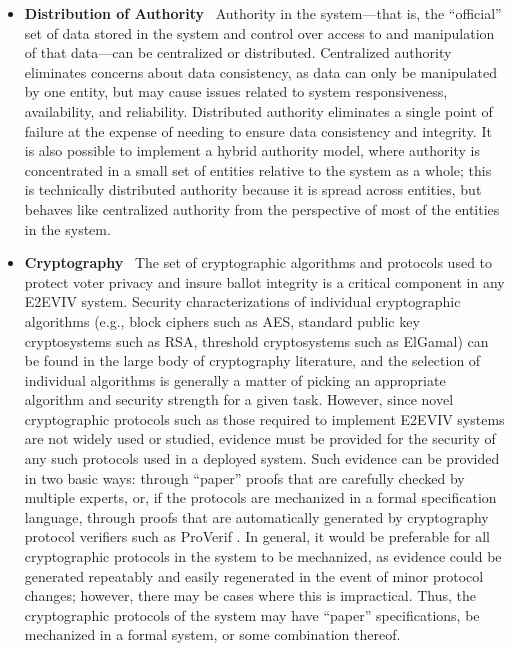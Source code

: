 \begin{itemize}
\item \textbf{Distribution of Authority} \ Authority in the
  system---that is, the ``official'' set of data stored in the system
  and control over access to and manipulation of that data---can be
  centralized or distributed. Centralized authority eliminates
  concerns about data consistency, as data can only be manipulated by
  one entity, but may cause issues related to system responsiveness,
  availability, and reliability. Distributed authority eliminates a
  single point of failure at the expense of needing to ensure data
  consistency and integrity. It is also possible to implement a hybrid
  authority model, where authority is concentrated in a small set of
  entities relative to the system as a whole; this is technically
  distributed authority because it is spread across entities, but
  behaves like centralized authority from the perspective of most of
  the entities in the system.

\item \textbf{Cryptography} \ The set of cryptographic algorithms and
  protocols used to protect voter privacy and insure ballot integrity
  is a critical component in any E2EVIV system. Security
  characterizations of individual cryptographic algorithms (e.g.,
  block ciphers such as AES, standard public key cryptosystems such as
  RSA, threshold cryptosystems such as ElGamal) can be found in the
  large body of cryptography literature, and the selection of
  individual algorithms is generally a matter of picking an
  appropriate algorithm and security strength for a given
  task. However, since novel cryptographic protocols such as those
  required to implement E2EVIV systems are not widely used or studied,
  evidence must be provided for the security of any such protocols
  used in a deployed system. Such evidence can be provided in two
  basic ways: through ``paper'' proofs that are carefully checked by
  multiple experts, or, if the protocols are mechanized in a formal
  specification language, through proofs that are automatically
  generated by cryptography protocol verifiers such as ProVerif
  \cite{ProVerif}. In general, it would be preferable for all
  cryptographic protocols in the system to be mechanized, as evidence
  could be generated repeatably and easily regenerated in the event of
  minor protocol changes; however, there may be cases where this is
  impractical. Thus, the cryptographic protocols of the system may
  have ``paper'' specifications, be mechanized in a formal system, or
  some combination thereof.


\end{itemize}
